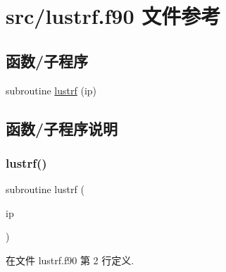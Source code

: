 \hypertarget{lustrf_8f90}{}\section{src/lustrf.f90 文件参考}
\label{lustrf_8f90}
\subsection*{函数/子程序}
\begin{DoxyCompactItemize}
\item 
subroutine \mbox{\hyperlink{lustrf_8f90_a5ef92fc62d057e720becaf39df720e09}{lustrf}} (ip)
\end{DoxyCompactItemize}


\subsection{函数/子程序说明}
\mbox{\label{lustrf_8f90_a5ef92fc62d057e720becaf39df720e09}} 
\subsubsection{\texorpdfstring{lustrf()}{lustrf()}}
{\footnotesize\ttfamily subroutine lustrf (\begin{DoxyParamCaption}\item[{}]{ip }\end{DoxyParamCaption})}



在文件 lustrf.\+f90 第 2 行定义.

